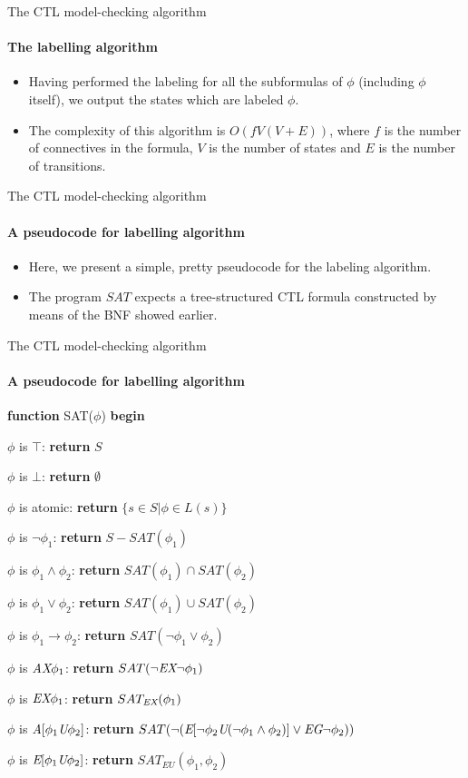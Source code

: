 \begin{frame}{The CTL model-checking algorithm}
	\framesubtitle{The labelling algorithm}
	\begin{itemize}
		\item
		{
			Having performed the labeling for all the subformulas of $\phi$ (including $\phi$
			itself), we output the states which are labeled $\phi$.
			\pause
		}
		\item
		{
			The complexity of this algorithm is $O(f V (V + E))$, where $f$ is the number of connectives in the formula, $V$ is the number of states and $E$ is the number of transitions.
		}
	\end{itemize}
\end{frame}

\begin{frame}{The CTL model-checking algorithm}
	\framesubtitle{A pseudocode for labelling algorithm}
	\begin{itemize}
		\item
		{
			Here, we present a simple, pretty pseudocode for the labeling algorithm.
			\pause
		}
		\item
		{
			The program $SAT$ expects a tree-structured CTL formula constructed by means of the BNF showed earlier.
		}
	\end{itemize}
\end{frame}

\begin{frame}{The CTL model-checking algorithm}
	\framesubtitle{A pseudocode for labelling algorithm}
		{\bf function} SAT($\phi$)
		{\bf begin}\\
		
		\qquad  $\phi$ is $\top$: {\bf return} $S$
		
		\qquad  $\phi$ is $\bot$: {\bf return} $\emptyset$
		
		\qquad  $\phi$ is atomic: {\bf return} $\{ s \in S | \phi \in L(s) \}$
		
		\qquad  $\phi$ is $\neg \phi_{1}$: {\bf return} $S - SAT(\phi_{1})$
		
		\qquad  $\phi$ is $\phi_{1} \land \phi_{2}$: {\bf return} $SAT(\phi_{1}) \cap SAT(\phi_{2})$
		
		\qquad  $\phi$ is $\phi_{1} \lor \phi_{2}$: {\bf return} $SAT(\phi_{1}) \cup SAT(\phi_{2})$
		
		\qquad  $\phi$ is $\phi_{1} \rightarrow \phi_{2}$: {\bf return} $SAT(\neg \phi_{1} \lor \phi_{2})$
		
		\qquad  $\phi$ is $\textit{A}\textit{X} \phi_{1}$: {\bf return} $SAT(\neg\textit{E}\textit{X}\neg \phi_{1})$
		
		\qquad  $\phi$ is $\textit{E}\textit{X} \phi_{1}$: {\bf return} $SAT_{\textit{E}\textit{X}}(\phi_{1})$
		
		\qquad  $\phi$ is $\textit{A}[\phi_{1} \textit{U} \phi_{2}]$: {\bf return} $SAT(\neg( \textit{E}[\neg \phi_{2} \textit{U} (\neg \phi_{1} \land \phi_{2})] \lor \textit{E}\textit{G}\neg \phi_{2} ))$
		
		\qquad  $\phi$ is $\textit{E}[\phi_{1} \textit{U} \phi_{2}]$: {\bf return} $SAT_{EU}(\phi_{1}, \phi_{2})$\\
		
\end{frame}

